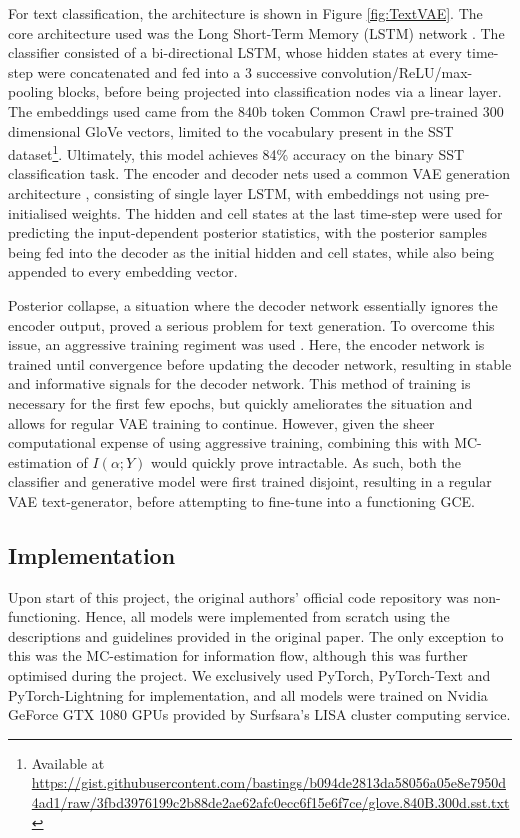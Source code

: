 For text classification, the architecture is shown in Figure \ref{fig:TextVAE}. The core architecture used was the Long Short-Term Memory (LSTM) network \cite{hochreiter1997long}. The classifier consisted of a bi-directional LSTM, whose hidden states at every time-step were concatenated and fed into a 3 successive convolution/ReLU/max-pooling blocks, before being projected into classification nodes via a linear layer. The embeddings used came from the 840b token Common Crawl pre-trained 300 dimensional GloVe vectors, limited to the vocabulary present in the SST dataset\footnote{Available at \url{https://gist.githubusercontent.com/bastings/b094de2813da58056a05e8e7950d4ad1/raw/3fbd3976199c2b88de2ae62afc0ecc6f15e6f7ce/glove.840B.300d.sst.txt} }. Ultimately, this model achieves 84\% accuracy on the binary SST classification task. The encoder and decoder nets used a common VAE generation architecture \cite{kingma2014autoencoding}, consisting of single layer LSTM, with embeddings not using pre-initialised weights. The hidden and cell states at the last time-step were used for predicting the input-dependent posterior statistics, with the posterior samples being fed into the decoder as the initial hidden and cell states, while also being appended to every embedding vector. 

Posterior collapse, a situation where the decoder network essentially ignores the encoder output, proved a serious problem for text generation. To overcome this issue, an aggressive training regiment was used \cite{he2019lagging}. Here, the encoder network is trained until convergence before updating the decoder network, resulting in stable and informative signals for the decoder network. This method of training is necessary for the first few epochs, but quickly ameliorates the situation and allows for regular VAE training to continue. However, given the sheer computational expense of using aggressive training, combining this with MC-estimation of $I(\alpha;Y)$ would quickly prove intractable. As such, both the classifier and generative model were first trained disjoint, resulting in a regular VAE text-generator, before attempting to fine-tune into a functioning GCE.


\subsection{Implementation}

Upon start of this project, the original authors' official code repository was non-functioning. Hence, all models were implemented from scratch using the descriptions and guidelines provided in the original paper. The only exception to this was the MC-estimation for information flow, although this was further optimised during the project. We exclusively used PyTorch, PyTorch-Text and PyTorch-Lightning for implementation, and all models were trained on Nvidia GeForce GTX 1080 GPUs provided by Surfsara's LISA cluster computing service. 



